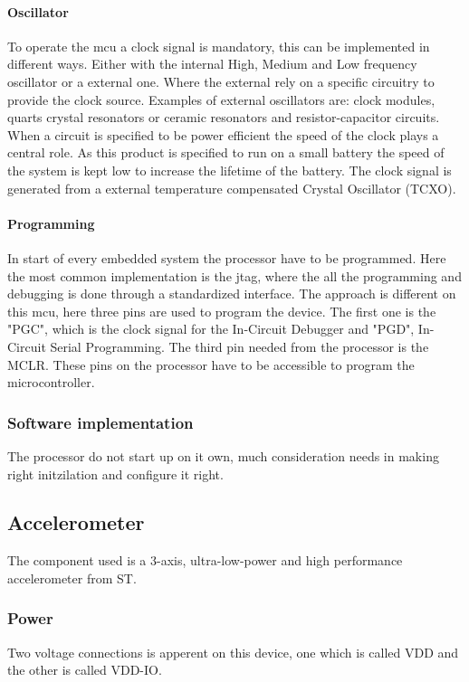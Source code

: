 \paragraph{Oscillator}
To operate the \gls{mcu} a clock signal is mandatory, this can be implemented in different ways. Either with the internal High, Medium and Low frequency oscillator or a external one. Where the external rely on a specific circuitry to provide the clock source. Examples of external oscillators are: clock modules, quarts crystal resonators or ceramic resonators and resistor-capacitor circuits. When a circuit is specified to be power efficient the speed of the clock plays a central role. As this product is specified to run on a small battery the speed of the system is kept low to increase the lifetime of the battery. The clock signal is generated from a external temperature compensated Crystal Oscillator (TCXO).

\paragraph{Programming} 
In start of every embedded system the processor have to be programmed. Here the most common implementation is the \gls{jtag}, where the all the programming and debugging is done through a standardized interface. The approach is different on this \gls{mcu}, here three pins are used to program the device. The first one is the "PGC", which is the clock signal for the In-Circuit Debugger and "PGD", In-Circuit Serial Programming. The third pin needed from the processor is the MCLR. These pins on the processor have to be accessible to program the microcontroller. 


\subsubsection{Software implementation}
The processor do not start up on it own, much consideration needs in making right initzilation and configure it right. 


\newpage
\subsection{Accelerometer} %
The component used is a 3-axis, ultra-low-power and high performance accelerometer from ST\cite{STacc}.

\subsubsection{Power}
Two voltage connections is apperent on this device, one which is called VDD and the other is called VDD-IO. 


